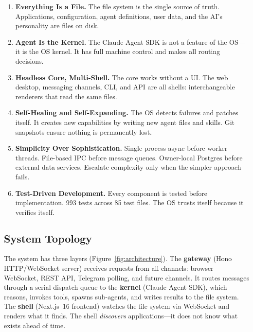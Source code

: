 \documentclass[11pt,a4paper]{article}
\begin{document}
\begin{enumerate}[leftmargin=*]
  \item \textbf{Everything Is a File.} The file system is the single source of truth. Applications, configuration, agent definitions, user data, and the AI's personality are files on disk.

  \item \textbf{Agent Is the Kernel.} The Claude Agent SDK is not a feature of the OS---it is the OS kernel. It has full machine control and makes all routing decisions.

  \item \textbf{Headless Core, Multi-Shell.} The core works without a UI. The web desktop, messaging channels, CLI, and API are all shells: interchangeable renderers that read the same files.

  \item \textbf{Self-Healing and Self-Expanding.} The OS detects failures and patches itself. It creates new capabilities by writing new agent files and skills. Git snapshots ensure nothing is permanently lost.

  \item \textbf{Simplicity Over Sophistication.} Single-process async before worker threads. File-based IPC before message queues. Owner-local Postgres before external data services. Escalate complexity only when the simpler approach fails.

  \item \textbf{Test-Driven Development.} Every component is tested before implementation. 993 tests across 85 test files. The OS trusts itself because it verifies itself.
\end{enumerate}

\subsection{System Topology}

The system has three layers (Figure~\ref{fig:architecture}). The \textbf{gateway} (Hono HTTP/WebSocket server) receives requests from all channels: browser WebSocket, REST API, Telegram polling, and future channels. It routes messages through a serial dispatch queue to the \textbf{kernel} (Claude Agent SDK), which reasons, invokes tools, spawns sub-agents, and writes results to the file system. The \textbf{shell} (Next.js~16 frontend) watches the file system via WebSocket and renders what it finds. The shell \emph{discovers} applications---it does not know what exists ahead of time.
\end{document}

